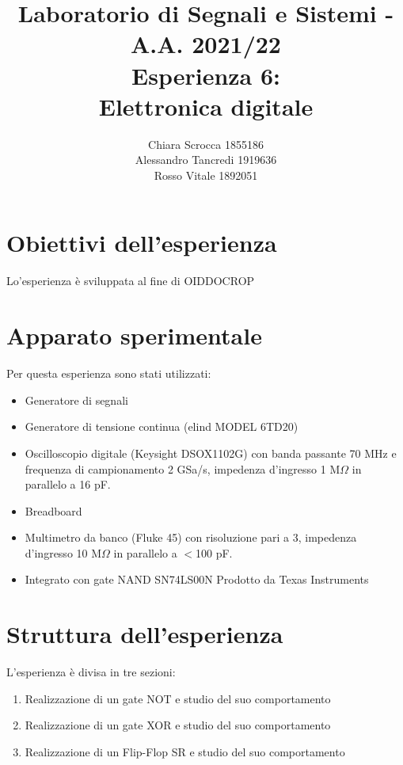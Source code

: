 \documentclass{article}
\begin{document}
\title{
  Laboratorio di Segnali e Sistemi - A.A. 2021/22 \\
  {\bf Esperienza 6:\\ 
  Elettronica digitale} \\}
\author{Chiara Scrocca 1855186 \\
Alessandro Tancredi 1919636 \\
        Rosso Vitale 1892051}
\maketitle
\date
\vspace{3cm}
\tableofcontents
\newpage
\section{Obiettivi dell'esperienza}
Lo'esperienza è sviluppata al fine di OIDDOCROP
    
\section{Apparato sperimentale}
    Per questa esperienza sono stati utilizzati:
    \begin{itemize}
        \item Generatore di segnali
        \item Generatore di tensione continua (elind MODEL 6TD20)
        \item Oscilloscopio digitale (Keysight DSOX1102G) con banda passante 70 MHz e frequenza di campionamento 2 GSa/s, impedenza d'ingresso 1 M$\Omega$ in parallelo a 16 pF.
        \item Breadboard 
        \item Multimetro da banco (Fluke 45) con risoluzione pari a 3\textperthousand, impedenza d'ingresso 10 M$\Omega$ in parallelo a $<$100 pF. 
        \item Integrato con gate NAND SN74LS00N Prodotto da Texas Instruments
    \end{itemize}
    
\section{Struttura dell'esperienza}
    L'esperienza è divisa in tre sezioni:
    \begin{enumerate}
        \item Realizzazione di un gate NOT e studio del suo comportamento
        \item Realizzazione di un gate XOR e studio del suo comportamento
        \item Realizzazione di un Flip-Flop SR e studio del suo comportamento
    \end{enumerate}
    \newpage
\end{document}
